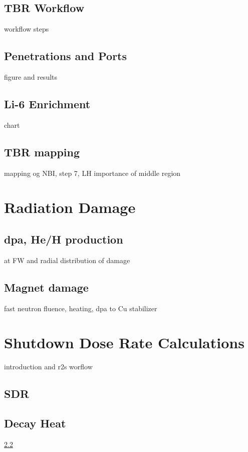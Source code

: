 \documentclass[12pt, letterpaper]{elsarticle}
\begin{document}
\subsection{TBR Workflow}
workflow steps
\subsection{Penetrations and Ports}
figure and results
\subsection{Li-6 Enrichment}
chart
\subsection{TBR mapping}
mapping og NBI, step 7, LH
importance of middle region
\section{Radiation Damage}
\subsection{dpa, He/H production}
at FW and radial distribution of damage
\subsection{Magnet damage}
fast neutron fluence, heating, dpa to Cu stabilizer
\section{Shutdown Dose Rate Calculations}
introduction and r2s worflow
\subsection{SDR}
\subsection{Decay Heat}

\ref{}
\end{document}
